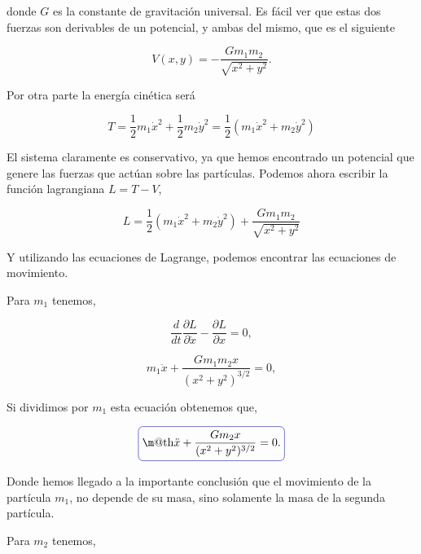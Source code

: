 \documentclass[a4paper,10pt]{article}
\makeatletter
\numberwithin{equation}{section}
\newcommand*{\boxcolor}{blue}
\renewcommand{\boxed}[1]{\textcolor{\boxcolor}{%
\tikz[baseline={([yshift=-1ex]current bounding box.center)}] \node [rectangle, minimum width=1ex,rounded corners,draw] {\normalcolor\m@th$\displaystyle#1$};}}
\makeatother
\begin{document}
donde $G$ es la constante de gravitación universal. Es fácil ver que estas dos  fuerzas 
son derivables de un potencial, y ambas del mismo, que es el siguiente

\begin{equation}
 V(x,y) = - \frac{G m_1 m_2}{\sqrt{x^2+y^2}}.
\end{equation}

Por otra parte la energía cinética será

\begin{equation}
 T = \frac{1}{2} m_1 \dot{x}^2 + \frac{1}{2} m_2 \dot{y}^2 = \frac{1}{2} (m_1 \dot{x}^2 + m_2 \dot{y}^2)
\end{equation}

El sistema claramente es conservativo, ya que hemos encontrado un potencial que genere 
las fuerzas que actúan sobre las partículas. Podemos ahora escribir la función lagrangiana
$L = T - V$, 

\begin{equation}
 L = \frac{1}{2} (m_1 \dot{x}^2 + m_2 \dot{y}^2) +  \frac{G m_1 m_2}{\sqrt{x^2+y^2}}
\end{equation}

Y utilizando las ecuaciones de Lagrange, podemos encontrar las ecuaciones de movimiento. 

\vspace{.3cm}

Para $m_1$ tenemos,

\begin{equation}
 \frac{d}{dt} \frac{\partial L}{\partial \dot{x}} - \frac{\partial L}{\partial x} = 0,
\end{equation}

\begin{equation}
 m_1 \ddot{x} + \frac{G m_1 m_2 x}{(x^2+y^2)^{3/2}} = 0,
\end{equation}

Si dividimos por $m_1$ esta ecuación obtenemos que,

\begin{equation}
 \boxed{\ddot{x} + \frac{G m_2 x}{(x^2+y^2)^{3/2}} = 0.}
\end{equation}

Donde hemos llegado a la importante conclusión que el movimiento de la partícula $m_1$,
no depende de su masa, sino solamente la masa de la segunda partícula.

\vspace{.3cm}

Para $m_2$ tenemos,
\end{document}
